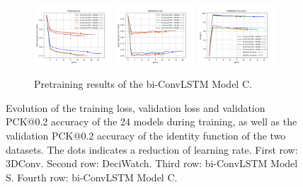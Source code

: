 \documentclass[./main.tex]{subfiles}
\begin{document}
\begin{figure}[htbp]
    \begin{subfigure}[b]{\textwidth}
        \centering
        \includegraphics[width=0.32\textwidth]{./entities/pretrained/unipose2/train_losses.png}
        \includegraphics[width=0.32\textwidth]{./entities/pretrained/unipose2/val_losses.png}
        \includegraphics[width=0.32\textwidth]{./entities/pretrained/unipose2/val_accs.png}
        \caption{Pretraining results of the bi-ConvLSTM Model C.}
    \end{subfigure}
    \hfill
    
    \caption{Evolution of the training loss, validation loss and validation PCK@0.2 accuracy of the 24 models during training, as well as the validation PCK@0.2 accuracy of the identity function of the two datasets. The dots indicates a reduction of learning rate. First row: 3DConv. Second row: DeciWatch. Third row: bi-ConvLSTM Model S. Fourth row: bi-ConvLSTM Model C.}
    \label{fig:pretraining_res}
\end{figure}
\end{document}
